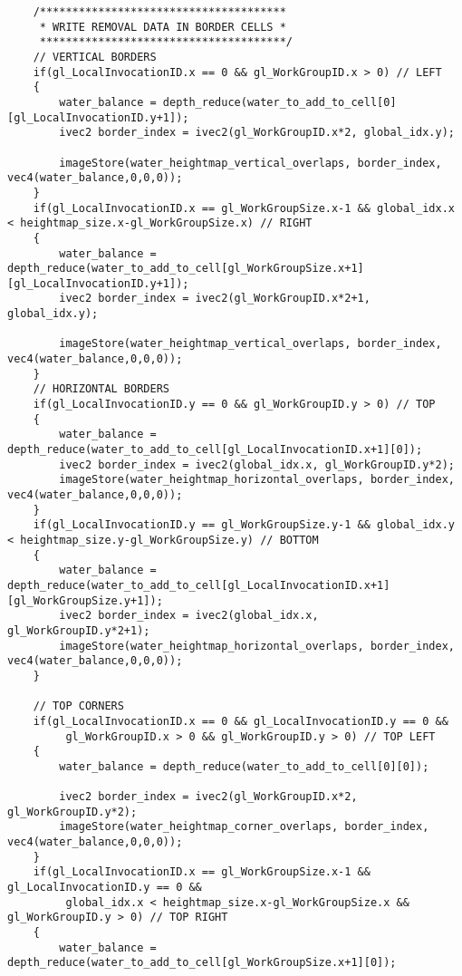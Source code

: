 \begin{verbatim}
    /**************************************
     * WRITE REMOVAL DATA IN BORDER CELLS *
     **************************************/
    // VERTICAL BORDERS
    if(gl_LocalInvocationID.x == 0 && gl_WorkGroupID.x > 0) // LEFT
    {
        water_balance = depth_reduce(water_to_add_to_cell[0][gl_LocalInvocationID.y+1]);
        ivec2 border_index = ivec2(gl_WorkGroupID.x*2, global_idx.y);

        imageStore(water_heightmap_vertical_overlaps, border_index, vec4(water_balance,0,0,0));
    }
    if(gl_LocalInvocationID.x == gl_WorkGroupSize.x-1 && global_idx.x < heightmap_size.x-gl_WorkGroupSize.x) // RIGHT
    {
        water_balance = depth_reduce(water_to_add_to_cell[gl_WorkGroupSize.x+1][gl_LocalInvocationID.y+1]);
        ivec2 border_index = ivec2(gl_WorkGroupID.x*2+1, global_idx.y);

        imageStore(water_heightmap_vertical_overlaps, border_index, vec4(water_balance,0,0,0));
    }
    // HORIZONTAL BORDERS
    if(gl_LocalInvocationID.y == 0 && gl_WorkGroupID.y > 0) // TOP
    {
        water_balance = depth_reduce(water_to_add_to_cell[gl_LocalInvocationID.x+1][0]);
        ivec2 border_index = ivec2(global_idx.x, gl_WorkGroupID.y*2);
        imageStore(water_heightmap_horizontal_overlaps, border_index, vec4(water_balance,0,0,0));
    }
    if(gl_LocalInvocationID.y == gl_WorkGroupSize.y-1 && global_idx.y < heightmap_size.y-gl_WorkGroupSize.y) // BOTTOM
    {
        water_balance = depth_reduce(water_to_add_to_cell[gl_LocalInvocationID.x+1][gl_WorkGroupSize.y+1]);
        ivec2 border_index = ivec2(global_idx.x, gl_WorkGroupID.y*2+1);
        imageStore(water_heightmap_horizontal_overlaps, border_index, vec4(water_balance,0,0,0));
    }

    // TOP CORNERS
    if(gl_LocalInvocationID.x == 0 && gl_LocalInvocationID.y == 0 &&
         gl_WorkGroupID.x > 0 && gl_WorkGroupID.y > 0) // TOP LEFT
    {
        water_balance = depth_reduce(water_to_add_to_cell[0][0]);

        ivec2 border_index = ivec2(gl_WorkGroupID.x*2, gl_WorkGroupID.y*2);
        imageStore(water_heightmap_corner_overlaps, border_index, vec4(water_balance,0,0,0));
    }
    if(gl_LocalInvocationID.x == gl_WorkGroupSize.x-1 && gl_LocalInvocationID.y == 0 &&
         global_idx.x < heightmap_size.x-gl_WorkGroupSize.x && gl_WorkGroupID.y > 0) // TOP RIGHT
    {
        water_balance = depth_reduce(water_to_add_to_cell[gl_WorkGroupSize.x+1][0]);


\end{verbatim}
